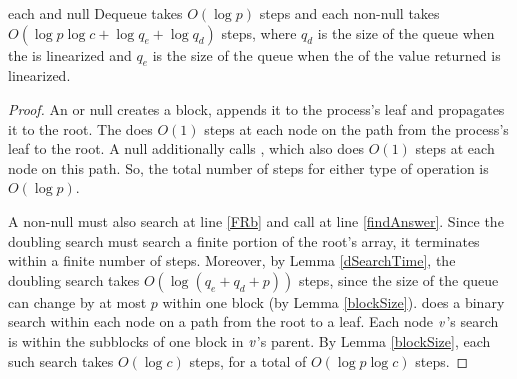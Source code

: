 \begin{mytheorem}\label{enqDeqTime}
each  and null Dequeue takes $O(\log p)$ steps 
and each non-null  takes
$O(\log p\log c + \log q_e+ \log q_d)$ steps,
where $q_d$ is the size of the queue when the  is linearized and 
$q_e$ is the size of the queue when the  of the value returned is linearized.
\end{mytheorem}
\begin{proof}
An  or null  creates a block, appends it to the process's 
leaf and propagates it to the root.  The   does $O(1)$ steps 
at each node on the path from the process's leaf to the root.
A null  additionally calls , which also does $O(1)$ steps
at each node on this path. 
So, the total number of steps for either type of operation is $O(\log p)$.

A non-null  must also search at line \ref{FRb} and call 
at line \ref{findAnswer}.
Since the doubling search must search a finite portion of the root's
 array, it terminates within a finite number of steps.
Moreover, by Lemma \ref{dSearchTime}, the doubling search takes $O(\log(q_e+q_d+p))$ steps,
since the size of the queue can change by at most $p$ within one block (by Lemma \ref{blockSize}).
 does a binary search within each node on a path from the root to a leaf.
Each node $\mbox{\textnormal{\textit{v}}}$'s search is within the subblocks of one block in $\mbox{\textnormal{\textit{v}}}$'s parent.
By Lemma \ref{blockSize}, each such search takes $O(\log c)$ steps, for a total of $O(\log p\log c)$ steps.
\end{proof}
